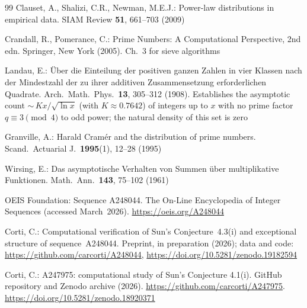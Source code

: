 \documentclass[pdflatex,sn-mathphys-num,Numbered]{sn-jnl}
\theoremstyle{thmstyleone}
\theoremstyle{thmstylethree}
\theoremstyle{thmstyletwo}
\numberwithin{equation}{section}
\begin{document}
\begin{thebibliography}{99}
	Clauset, A., Shalizi, C.R., Newman, M.E.J.:
	Power-law distributions in empirical data.
	SIAM Review \textbf{51}, 661--703 (2009)

	Crandall, R., Pomerance, C.:
	Prime Numbers: A Computational Perspective,
	2nd edn. Springer, New York (2005).
	Ch.~3 for sieve algorithms

	Landau, E.:
	\"Uber die Einteilung der positiven ganzen Zahlen in vier
	Klassen nach der Mindestzahl der zu ihrer additiven Zusammensetzung
	erforderlichen Quadrate.
	Arch.\ Math.\ Phys.\ \textbf{13}, 305--312 (1908).
	Establishes the asymptotic count ${\sim}\,Kx/\sqrt{\ln x}$
	(with $K \approx 0.7642$) of integers up to $x$ with no prime factor
	$q \equiv 3 \pmod{4}$ to odd power; the natural density of this
	set is zero

	Granville, A.:
	Harald Cram\'er and the distribution of prime numbers.
	Scand.\ Actuarial J.\ \textbf{1995}(1), 12--28 (1995)

	Wirsing, E.:
	Das asymptotische Verhalten von Summen \"uber multiplikative
	Funktionen.
	Math.\ Ann.\ \textbf{143}, 75--102 (1961)

	OEIS Foundation:
	Sequence A248044.
	The On-Line Encyclopedia of Integer Sequences
	(accessed March~2026).
	\url{https://oeis.org/A248044}

	Corti, C.:
	Computational verification of Sun's Conjecture~4.3(i)
	and exceptional structure of sequence~A248044.
	Preprint, in preparation (2026); data and code:
	\url{https://github.com/carcorti/A248044},
	\url{https://doi.org/10.5281/zenodo.19182594}

	Corti, C.:
	A247975: computational study of Sun's Conjecture 4.1(i).
	GitHub repository and Zenodo archive (2026).
	\url{https://github.com/carcorti/A247975}.
	\url{https://doi.org/10.5281/zenodo.18920371}

\end{thebibliography}
\end{document}
